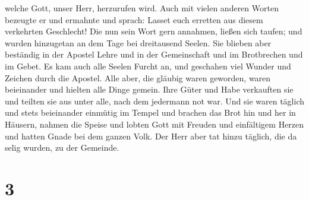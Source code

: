 welche Gott, unser Herr, herzurufen wird.  Auch mit
vielen anderen Worten bezeugte er und ermahnte und sprach: Lasset euch
erretten aus diesem verkehrten Geschlecht!  Die nun sein
Wort gern annahmen, ließen sich taufen; und wurden hinzugetan an dem
Tage bei dreitausend Seelen.  Sie blieben aber beständig
in der Apostel Lehre und in der Gemeinschaft und im Brotbrechen und im
Gebet.  Es kam auch alle Seelen Furcht an, und geschahen
viel Wunder und Zeichen durch die Apostel.  Alle aber,
die gläubig waren geworden, waren beieinander und hielten alle Dinge
gemein.  Ihre Güter und Habe verkauften sie und teilten
sie aus unter alle, nach dem jedermann not war.  Und sie
waren täglich und stets beieinander einmütig im Tempel und brachen das
Brot hin und her in Häusern,  nahmen die Speise und
lobten Gott mit Freuden und einfältigem Herzen und hatten Gnade bei dem
ganzen Volk. Der Herr aber tat hinzu täglich, die da selig wurden, zu
der Gemeinde.

\hypertarget{section-2}{%
\section{3}\label{section-2}}

